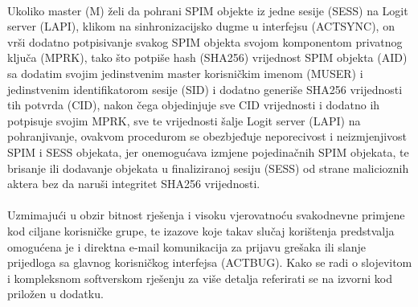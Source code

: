 \paragraph*{}
Ukoliko master (M) želi da pohrani SPIM objekte iz jedne sesije (SESS) na Logit server (LAPI), klikom na sinhronizacijsko dugme u interfejsu (ACTSYNC), on vrši dodatno potpisivanje svakog SPIM objekta svojom komponentom privatnog ključa (MPRK), tako što potpiše hash (SHA256) vrijednost SPIM objekta (AID) sa dodatim svojim jedinstvenim master korisničkim imenom (MUSER) i jedinstvenim identifikatorom sesije (SID) i dodatno generiše SHA256 vrijednosti tih potvrda (CID), nakon čega objedinjuje sve CID vrijednosti i dodatno ih potpisuje svojim MPRK, sve te vrijednosti šalje Logit server (LAPI) na pohranjivanje, ovakvom procedurom se obezbjeđuje neporecivost i neizmjenjivost SPIM i SESS objekata, jer onemogućava izmjene pojedinačnih SPIM objekata, te brisanje ili dodavanje objekata u finaliziranoj sesiju (SESS) od strane malicioznih aktera bez da naruši integritet SHA256 vrijednosti.

\paragraph*{}
Uzmimajući u obzir bitnost rješenja i visoku vjerovatnoću svakodnevne primjene kod ciljane korisničke grupe, te izazove koje takav slučaj korištenja predstvalja omogućena je i direktna e-mail komunikacija za prijavu grešaka ili slanje prijedloga sa glavnog korisničkog interfejsa (ACTBUG). Kako se radi o slojevitom i kompleksnom softverskom rješenju za više detalja referirati se na izvorni kod priložen u dodatku.

